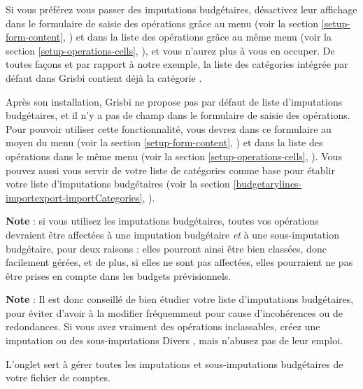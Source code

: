 Si vous préférez vous passer des imputations budgétaires, désactivez leur affichage dans le formulaire de saisie des opérations grâce au menu  (voir la section \vref{setup-form-content}, ) et dans la liste des opérations grâce au même menu (voir la section \vref{setup-operations-cells}, ), et vous n'aurez plus  à vous en occuper. De toutes façons et par rapport à notre exemple, la liste des catégories intégrée par défaut dans Grisbi contient déjà la catégorie .

Après son installation, Grisbi ne propose pas par défaut de liste d'imputations budgétaires, et il n'y a pas de champ  dans le formulaire de saisie des opérations. Pour pouvoir utiliser cette fonctionnalité, vous devrez  dans ce formulaire au moyen du  menu  (voir la section \vref{setup-form-content}, ) et dans la liste des opérations dans le même menu (voir la section \vref{setup-operations-cells}, ). Vous pouvez aussi vous servir de votre liste de catégories comme base pour établir votre liste d'imputations budgétaires (voir la section \vref{budgetarylines-importexport-importCategories}, ).

\textbf{Note} : si vous utilisez les imputations budgétaires, toutes vos opérations devraient être affectées à une imputation budgétaire \emph{et} à une sous-imputation budgétaire, pour deux raisons : elles pourront ainsi être bien classées, donc facilement gérées, et de plus, si elles ne sont pas affectées, elles pourraient ne pas être prises en compte dans les budgets prévisionnels.

\textbf{Note} : Il est donc conseillé de bien étudier votre liste d'imputations budgétaires, pour éviter d'avoir à la modifier fréquemment pour cause d'incohérences ou de redondances. Si vous avez vraiment des opérations inclassables, créez une imputation ou des sous-imputations \og Divers \fg{}, mais n'abusez pas de leur emploi.

L'onglet  sert à gérer toutes les imputations et sous-imputations budgétaires de votre fichier de comptes. 

